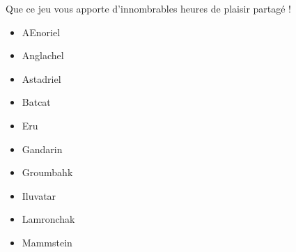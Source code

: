 \begin{titlepage}
{\vspace{0.5cm}
Que ce jeu vous apporte d'innombrables heures de plaisir partagé !

\vspace{0.7cm}
\vspace{0.5cm}

\begin{multicols}{3}
\begin{itemize}
\item \og AEnoriel \fg
\item \og Anglachel \fg
\item \og Astadriel \fg
\item \og Batcat \fg
\item \og Eru \fg
\item \og Gandarin \fg
\item \og Groumbahk \fg
\item \og Iluvatar \fg
\item \og Lamronchak \fg
\item \og Mammstein \fg
\end{itemize}
\end{multicols}

\vfill

}


\end{titlepage}